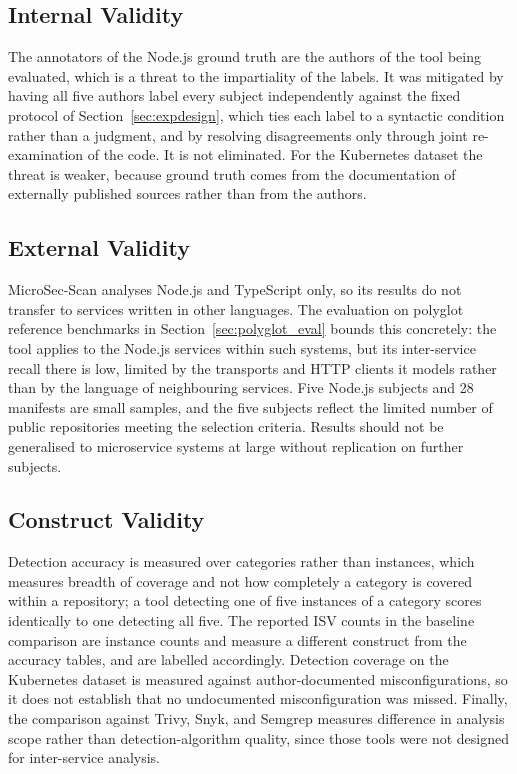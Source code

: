 \documentclass[preprint,12pt]{elsarticle}
\newcommand{\new}[1]{#1}
\begin{document}
\new{\subsection{Internal Validity}}

\new{The annotators of the Node.js ground truth are the authors of the tool
being evaluated, which is a threat to the impartiality of the labels. It was
mitigated by having all five authors label every subject independently
against the fixed protocol of Section~\ref{sec:expdesign}, which ties each
label to a syntactic condition rather than a judgment, and by resolving
disagreements only through joint re-examination of the code. It is not
eliminated. For the Kubernetes dataset the threat is weaker, because ground
truth comes from the documentation of externally published sources rather
than from the authors.}

\new{\subsection{External Validity}}

\new{MicroSec-Scan analyses Node.js and TypeScript only, so its results do
not transfer to services written in other languages. The evaluation on
polyglot reference benchmarks in
Section~\ref{sec:polyglot_eval} bounds this concretely: the tool applies to
the Node.js services within such systems, but its inter-service recall there
is low, limited by the transports and HTTP clients it models rather than by
the language of neighbouring services. Five Node.js subjects and 28
manifests are small samples, and the five subjects reflect the limited
number of public repositories meeting the selection criteria. Results should
not be generalised to microservice systems at large without replication on
further subjects.}

\new{\subsection{Construct Validity}}

\new{Detection accuracy is measured over categories rather than instances,
which measures breadth of coverage and not how completely a category is
covered within a repository; a tool detecting one of five instances of a
category scores identically to one detecting all five. The reported ISV
counts in the baseline comparison are instance counts and measure a
different construct from the accuracy tables, and are labelled accordingly.
Detection coverage on the Kubernetes dataset is measured against
author-documented misconfigurations, so it does not establish that no
undocumented misconfiguration was missed. Finally, the comparison against
Trivy, Snyk, and Semgrep measures difference in analysis scope rather than
detection-algorithm quality, since those tools were not designed for
inter-service analysis.}
\end{document}
